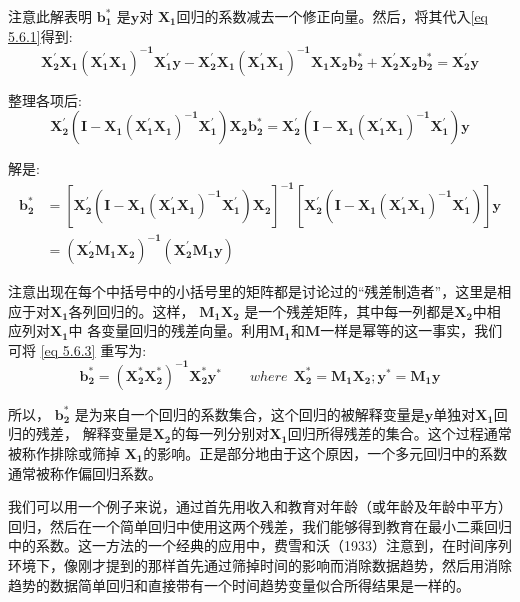 注意此解表明 $ \boldsymbol{ b_1^{*} } $ 是$ \boldsymbol{ y } $对 $ \boldsymbol{ X_1 } $回归的系数减去一个修正向量。然后，将其代入\ref{eq 5.6.1}得到:
$$ \boldsymbol{ X_{2}^{\prime} X_{1}\left(X_{1}^{\prime} X_{1}\right)^{-1} X_{1}^{\prime} y-X_{2}^{\prime} X_{1}\left(X_{1}^{\prime} X_{1}\right)^{-1} X_{1} X_{2} b_{2}^{*}+X_{2}^{\prime} X_{2} b_{2}^{*}=X_{2}^{\prime} y }$$

整理各项后:
$$ \boldsymbol{ X_{2}^{\prime}\left(I-X_{1}\left(X_{1}^{\prime} X_{1}\right)^{-1} X_{1}^{\prime}\right) X_{2} b_{2}^{*}=X_{2}^{\prime}\left(I-X_{1}\left(X_{1}^{\prime} X_{1}\right)^{-1} X_{1}^{\prime}\right) y } $$

解是:
\begin{equation}
    \begin{aligned}
        \boldsymbol{ b_{2}^{*}} 
        & = \boldsymbol{ \left[X_{2}^{\prime}\left(I-X_{1}\left(X_{1}^{\prime} X_{1}\right)^{-1} X_{1}^{\prime}\right) X_{2}\right]^{-1}\left[X_{2}^{\prime}\left(I-X_{1}\left(X_{1}^{\prime} X_{1}\right)^{-1} X_{1}^{\prime}\right)\right] y } \\ 
        & = \boldsymbol{ \left(X_{2}^{\prime} M_{1} X_{2}\right)^{-1}\left(X_{2}^{\prime} M_{1} y\right) }
    \end{aligned} 
    \label{eq 5.6.3}
\end{equation}

注意出现在每个中括号中的小括号里的矩阵都是讨论过的“残差制造者”，这里是相应于对$ \boldsymbol{ X_1 } $各列回归的。这样， 
$ \boldsymbol{ M_1X_2 } $ 是一个残差矩阵，其中每一列都是$ \boldsymbol{ X_2 } $中相应列对$ \boldsymbol{ X_1 } $中
各变量回归的残差向量。利用$ \boldsymbol{ M_1 } $和$ \boldsymbol{ M } $一样是幂等的这一事实，我们可将 \eqref{eq 5.6.3} 重写为:
\begin{equation}
    \boldsymbol{  b_{2}^{*}=\left(X_{2}^{*} X_{2}^{*}\right)^{-1} X_{2}^{*} y^{*}} \qquad where \ \ \boldsymbol{ X_{2}^{*}=M_{1} X_{2}}; \boldsymbol{ y^{*}=M_{1} y}
\end{equation}

所以， $ \boldsymbol{ b_2^{*}} $  是为来自一个回归的系数集合，这个回归的被解释变量是$ \boldsymbol{ y } $单独对$ \boldsymbol{ X_1 } $回归的残差，
解释变量是$ \boldsymbol{ X_2 } $的每一列分别对$ \boldsymbol{ X_1 } $回归所得残差的集合。这个过程通常被称作排除或筛掉
$ \boldsymbol{ X_1 } $的影响。正是部分地由于这个原因，一个多元回归中的系数通常被称作偏回归系数。

我们可以用一个例子来说，通过首先用收入和教育对年龄（或年龄及年龄中平方）回归，然后在一个简单回归中使用这两个残差，我们能够得到教育在最小二乘回归中的系数。这一方法的一个经典的应用中，费雪和沃（1933）注意到，在时间序列环境下，像刚才提到的那样首先通过筛掉时间的影响而消除数据趋势，然后用消除趋势的数据简单回归和直接带有一个时间趋势变量似合所得结果是一样的。

